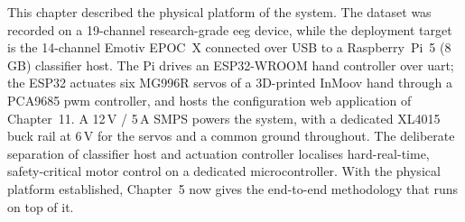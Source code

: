 This chapter described the physical platform of the system. The
dataset was recorded on a 19-channel research-grade \acrshort{eeg}
device, while the deployment target is the 14-channel Emotiv EPOC~X
connected over USB to a Raspberry~Pi~5 (8\,GB) classifier host. The Pi
drives an ESP32-WROOM hand controller over \acrshort{uart}; the ESP32
actuates six MG996R servos of a 3D-printed InMoov hand through a
PCA9685 \acrshort{pwm} controller, and hosts the configuration web
application of Chapter~11. A 12\,V / 5\,A SMPS powers the system, with
a dedicated XL4015 buck rail at 6\,V for the servos and a common
ground throughout. The deliberate separation of classifier host and
actuation controller localises hard-real-time, safety-critical motor
control on a dedicated microcontroller. With the physical platform
established, Chapter~5 now gives the end-to-end methodology that runs
on top of it.